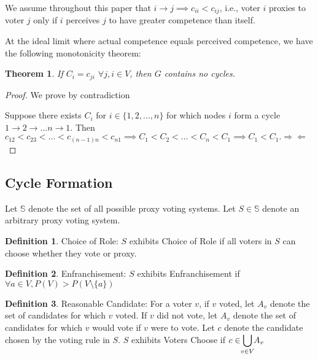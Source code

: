 \documentclass[10pt]{article}
\newtheorem{theorem}{Theorem}[section]
\theoremstyle{definition}
\newtheorem{definition}{Definition}[section]
\newcommand{\bb}[1]{\mathbb{#1}}
\begin{document}
We assume throughout this paper that $i \rightarrow j \implies c_{ii} < c_{ij}$, i.e., voter $i$ proxies to voter $j$ only if $i$ perceives $j$ to have greater competence than itself.


At the ideal limit where actual competence equals perceived competence, we have the following monotonicity theorem:

\begin{theorem}

If $C_i = c_{ji}$ $\forall j, i \in V$, then $G$ contains no cycles.

\end{theorem}

\begin{proof}

We prove by contradiction

Suppose there exists $C_i$ for $i \in \{1, 2, ..., n\}$ for which nodes $i$ form a cycle $1 \rightarrow 2 \rightarrow ... n \rightarrow 1$. Then $c_{12} < c_{23 }< ... < c_{(n-1)n} < c_{n1} \implies C_1 < C_2 < ... < C_n < C_1 \implies C_1 < C_1. \Rightarrow\Leftarrow$
\end{proof}

\subsection{Cycle Formation}
Let $\bb{S}$ denote the set of all possible proxy voting systems. Let $S \in \bb{S}$ denote an arbitrary proxy voting system.


\theoremstyle{definition}
\begin{definition}{Choice of Role:}
$S$ exhibits Choice of Role if all voters in $S$ can choose whether they vote or proxy.
\end{definition}

\theoremstyle{definition}
\begin{definition}{Enfranchisement:}
$S$ exhibits Enfranchisement if $\forall a \in V, P(V) > P(V\setminus\{a\})$
\end{definition}

\theoremstyle{definition}
\begin{definition}{Reasonable Candidate:}
For a voter $v$, if $v$ voted, let $A_v$ denote the set of candidates for which $v$ voted. If $v$ did not vote, let $A_v$ denote the set of candidates for which $v$ would vote if $v$ were to vote. Let $c$ denote the candidate chosen by the voting rule in $S$. $S$ exhibits Voters Choose if $c \in \smashoperator{\bigcup\limits_{v \in V}}A_v$ 
\end{definition}
\end{document}
